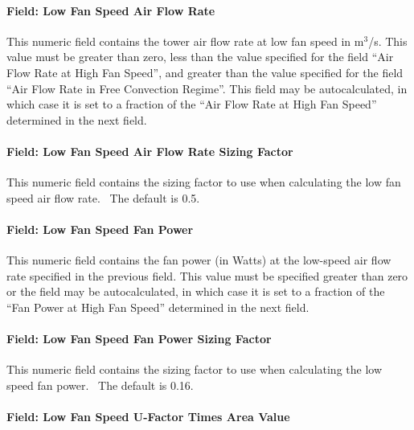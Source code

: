 \paragraph{Field: Low Fan Speed Air Flow Rate}\label{field-low-fan-speed-air-flow-rate}

This numeric field contains the tower air flow rate at low fan speed in m\(^{3}\)/s. This value must be greater than zero, less than the value specified for the field ``Air Flow Rate at High Fan Speed'', and greater than the value specified for the field ``Air Flow Rate in Free Convection Regime''. This field may be autocalculated, in which case it is set to a fraction of the ``Air Flow Rate at High Fan Speed'' determined in the next field.

\paragraph{Field: Low Fan Speed Air Flow Rate Sizing Factor}\label{field-low-fan-speed-air-flow-rate-sizing-factor}

This numeric field contains the sizing factor to use when calculating the low fan speed air flow rate.~ The default is 0.5.

\paragraph{Field: Low Fan Speed Fan Power}\label{field-low-fan-speed-fan-power}

This numeric field contains the fan power (in Watts) at the low-speed air flow rate specified in the previous field. This value must be specified greater than zero or the field may be autocalculated, in which case it is set to a fraction of the ``Fan Power at High Fan Speed'' determined in the next field.

\paragraph{Field: Low Fan Speed Fan Power Sizing Factor}\label{field-low-fan-speed-fan-power-sizing-factor}

This numeric field contains the sizing factor to use when calculating the low speed fan power.~ The default is 0.16.

\paragraph{Field: Low Fan Speed U-Factor Times Area Value}\label{field-low-fan-speed-u-factor-times-area-value}

